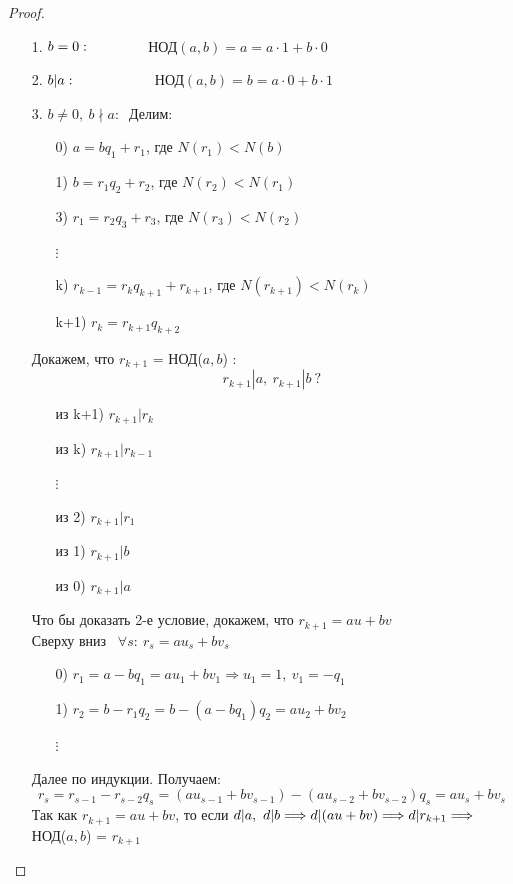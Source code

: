 \documentclass[a4paper, 12pt]{article}
\newcommand\tab[1][.5cm]{\hspace*{#1}}
\theoremstyle{definition}
\begin{document}
  \begin{proof}\tab
    \begin{itemize}
      \item[1.] $b = 0: \ \tab[1.27cm] $ НОД$(a,b) = a = a \cdot 1 + b \cdot 0$
      \item[2.] $b|a: \ \tab[1.8cm] $ НОД$(a,b) = b = a \cdot 0 + b \cdot 1$
      \item[3.] $b \neq 0, \ b\nmid a: \ $ Делим: 
      \begin{itemize}
        \item[0)] $a = bq_1 + r_1$, где $N(r_1) < N(b)$
        \item[1)] $b = r_1q_2 + r_2$, где $N(r_2) < N(r_1)$
        \item[3)] $r_1 = r_2q_3 + r_3$, где $N(r_3) < N(r_2)$
        \item[ $\vdots$ ]
        \item[k)] $r_{k-1} = r_kq_{k+1} + r_{k+1}$, где $N(r_{k+1}) < N(r_k)$
        \item[k+1)] $r_k = r_{k+1}q_{k+2}$ 
      \end{itemize}
      Докажем, что $r_{k+1}$ = НОД($a,b$) :
      $$r_{k+1} | a, \ r_{k+1} | b \ ?$$
      \begin{itemize}
        \item[из k+1)] $r_{k+1} | r_k$
        \item[из k)] $r_{k+1} | r_{k-1}$
        \item[ $\vdots$ ]
        \item[из 2)] $r_{k+1} | r_1$
        \item[из 1)] $r_{k+1} | b$
        \item[из 0)] $r_{k+1} | a$ 
      \end{itemize}
      Что бы доказать 2-е условие, докажем, что $r_{k+1} = au+bv$\\
      Сверху вниз \  $\forall s: \ r_s = au_s+bv_s$
      \begin{itemize}
        \item[0)] $r_{1} = a-bq_1 = au_1+bv_1 \Longrightarrow u_1=1, \ v_1 = -q_1$
        \item[1)] $r_{2} = b - r_1q_2 = b-(a-bq_1)q_2 = au_2+bv_2$
        \item[ $\vdots$ ]  
      \end{itemize}
      Далее по индукции. Получаем:
      $$r_s = r_{s-1} - r_{s-2}q_s = (au_{s-1} + bv_{s-1}) - (au_{s-2} + bv_{s-2})q_s = au_s + bv_s$$
      Так как $r_{k+1} = au+bv$, то если $d|a, \ d| b \Longrightarrow d|(au+bv) \Longrightarrow d|r_{k+1}\\ \Longrightarrow $ НОД($a,b$) = $r_{k+1}$
    \end{itemize}
  \end{proof}
\end{document}

